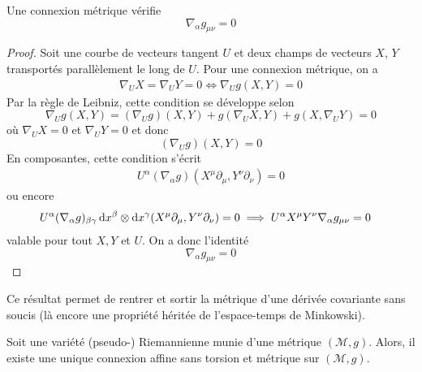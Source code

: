 \begin{theoremframe}
    \begin{lemme}
        Une connexion métrique vérifie
        \begin{equation}
        \label{eq:métrique métrique}
            \nabla_\alpha g_{\mu\nu} = 0
        \end{equation}
    \end{lemme}
\end{theoremframe}
\begin{proof}
    Soit une courbe de vecteurs tangent $U$ et deux champs de vecteurs $X$, $Y$ transportés parallèlement le long de $U$. Pour une connexion métrique, on a
    \begin{align}
        \nabla_U X = \nabla_U Y = 0 \iff \nabla_U g(X,Y) = 0
    \end{align}
    Par la règle de Leibniz, cette condition se développe selon
    \begin{equation}
        \nabla_U g(X, Y) = (\nabla_U g)(X, Y) + g(\nabla_U X, Y) + g(X, \nabla_U Y) = 0
    \end{equation}
    où $\nabla_U X = 0$ et $\nabla_U Y = 0$ et donc
    \begin{equation}
         (\nabla_U g)(X, Y) =0
    \end{equation}
    En composantes, cette condition s'écrit
    \begin{align}
        U^{\alpha}(\nabla_{\alpha}g)(X^{\mu}\partial_{\mu}, Y^{\nu}\partial_{\nu}) = 0
        \label{conexion métrique 1}
    \end{align}
    ou encore
    \begin{align}
        &U^{\alpha}(\nabla_{\alpha}g)_{\beta \gamma} \,\mathrm{d} x^{\beta}\otimes \mathrm{d} x^{\gamma}(X^{\mu}\partial_{\mu}, Y^{\nu}\partial_{\nu}) = 0 \implies U^{\alpha}X^{\mu}Y^{\nu}\nabla_{\alpha}g_{\mu \nu} =0
    \end{align}
    valable pour tout $X,Y$ et $U$. On a donc l'identité
    \begin{equation}
    \nabla_{\alpha}g_{\mu \nu} =0
    \end{equation}
\end{proof}
Ce résultat permet de rentrer et sortir la métrique d'une dérivée covariante sans soucis (là encore une propriété héritée de l'espace-temps de Minkowski).
\begin{theoremframe}
    \begin{theorem}
        \label{thm:fondamental riemannien}
        Soit une variété (pseudo-) Riemannienne munie d'une métrique $(\mathcal{M},g)$. Alors, il existe une unique connexion affine sans torsion et métrique sur $(\mathcal{M},g)$.
    \end{theorem}
\end{theoremframe}  
